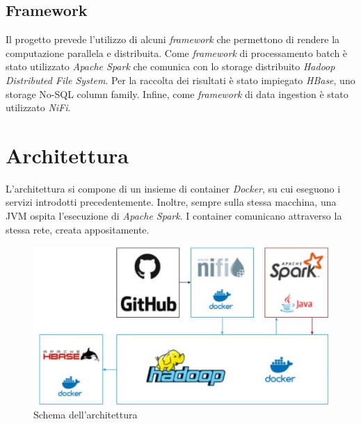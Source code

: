 \documentclass[conference]{IEEEtran}
\begin{document}
\subsection*{\textbf{Framework}}
Il progetto prevede l'utilizzo di alcuni \emph{framework} che permettono di rendere la computazione parallela e distribuita.
Come \emph{framework} di processamento batch \`{e} stato utilizzato \emph{Apache Spark} che comunica con
 lo storage distribuito \emph{Hadoop Distributed File System}. Per la raccolta dei risultati \`{e} stato impiegato \emph{HBase}, uno storage No-SQL column family. Infine, come \emph{framework} di data ingestion \`{e} stato utilizzato \emph{NiFi}.
\section{\textbf{Architettura}}
L'architettura si compone di un insieme di container \emph{Docker}, su cui eseguono i servizi introdotti precedentemente. Inoltre, sempre sulla stessa macchina, una JVM ospita l'esecuzione di \emph{Apache Spark}. I container comunicano attraverso la stessa rete, creata appositamente.
\begin{figure}[htbp]
\includegraphics[scale=0.24]{frameworks.png}
\caption{Schema dell'architettura}\label{figura:architettura}
\label{fig}
\end{figure}
\end{document}
